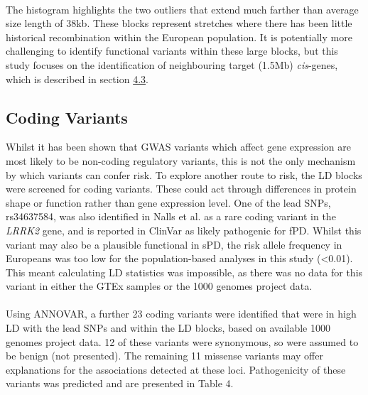 \documentclass{article}
\begin{document}
\\The histogram highlights the two outliers that extend much farther than average size length of 38kb. These blocks represent stretches where there has been little historical recombination within the European population. It is potentially more challenging to identify functional variants within these large blocks, but this study focuses on the identification of neighbouring target (\pm1.5Mb) \textit{cis}-genes, which is described in section \hyperref[subsec:eQTLcoloc]{4.3}. 
\newpage
\subsection{Coding Variants}
\label{subsec:codingvariants}
Whilst it has been shown that GWAS variants which affect gene expression are most likely to be non-coding regulatory variants\cite{Nicolae2010Trait-AssociatedGWAS}, this is not the only mechanism by which variants can confer risk. To explore another route to risk, the LD blocks were screened for coding variants. These could act through differences in protein shape or function rather than gene expression level. One of the lead SNPs, rs34637584, was also identified in Nalls et al.\cite{Nalls2019IdentificationStudies} as a rare coding variant in the \textit{LRRK2} gene, and is reported in ClinVar as likely pathogenic for fPD. Whilst this variant may also be a plausible functional in sPD, the risk allele frequency in Europeans was too low for the population-based analyses in this study (<0.01). This meant calculating LD statistics was impossible, as there was no data for this variant in either the GTEx samples or the 1000 genomes project data. 
\\
\\Using ANNOVAR\cite{Wang2010ANNOVAR:Data}, a further 23 coding variants were identified that were in high LD with the lead SNPs and within the LD blocks, based on available 1000 genomes project data. 12 of these variants were synonymous, so were assumed to be benign (not presented). The remaining 11 missense variants may offer explanations for the associations detected at these loci. Pathogenicity of these variants was predicted and are presented in Table 4.
\end{document}
